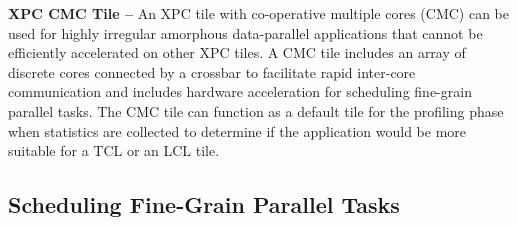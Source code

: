 \textbf{XPC CMC Tile --} An XPC tile with co-operative multiple cores
(CMC) can be used for highly irregular amorphous data-parallel
applications that cannot be efficiently accelerated on other XPC tiles. A
CMC tile includes an array of discrete cores connected by a crossbar to
facilitate rapid inter-core communication and includes hardware
acceleration for scheduling fine-grain parallel tasks. The CMC tile can
function as a default tile for the profiling phase when statistics are
collected to determine if the application would be more suitable for a
TCL or an LCL tile.



\subsection{Scheduling Fine-Grain Parallel Tasks}

\begin{figure}
  \begin{minipage}[b]{0.53\tw}
    
  \end{minipage}%
  \hfill%
  \begin{minipage}[b]{0.45\tw}
    
  \end{minipage}
\end{figure}


